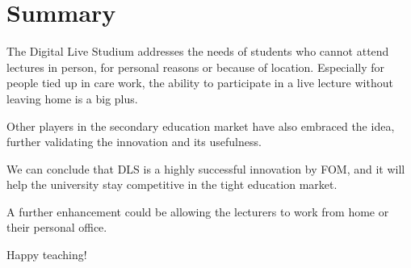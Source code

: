 %
%

\pagebreak
\section{Summary}

\onehalfspacing

The Digital Live Studium addresses the needs of students who cannot attend lectures in person, for personal reasons or because of location. Especially for people tied up in care work, the ability to participate in a live lecture without leaving home is a big plus.

Other players in the secondary education market have also embraced the idea, further validating the innovation and its usefulness.

We can conclude that DLS is a highly successful innovation by FOM, and it will help the university stay competitive in the tight education market.

A further enhancement could be allowing the lecturers to work from home or their personal office.

Happy teaching!
